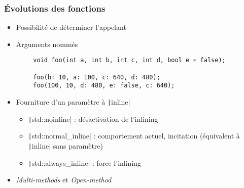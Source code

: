 \documentclass[C++.tex]{subfiles}
\begin{document}
\begin{frame}[fragile]
	\frametitle{Évolutions des fonctions}
	\begin{itemize}
		\item Possibilité de déterminer l'appelant
		\item Arguments nommés
	\end{itemize}

	\begin{verbatim}
		void foo(int a, int b, int c, int d, bool e = false);

		foo(b: 10, a: 100, c: 640, d: 480);
		foo(100, 10, d: 480, e: false, c: 640);
	\end{verbatim}

	\begin{itemize}
		\item Fourniture d'un paramètre à \texttt|inline|
		\begin{itemize}
			\item \texttt|std::noinline| : désactivation de l'inlining
			\item \texttt|std::normal_inline| : comportement actuel, incitation (équivalent à \texttt|inline| sans paramètre)
			\item \texttt|std::always_inline| : force l'inlining
		\end{itemize}
		\item \textit{Multi-methods} et \textit{Open-method}
	\end{itemize}

\end{frame}
\end{document}
